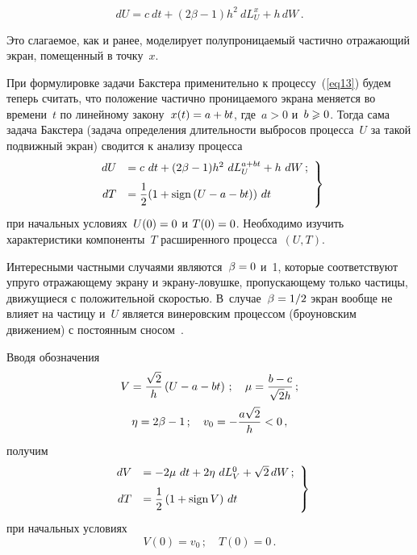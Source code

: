 \begin{multicols}{2}
\noindent
\begin{equation}
  \label{eq13}
  dU =c\ dt + (2\beta -1)h^2\ dL^x_U + h\,dW\,.
\end{equation}

\noindent
Это слагаемое, как и ранее, моделирует полупроницаемый частично отражающий экран, помещенный в точку~$x$.

При формулировке задачи Бакстера применительно к процессу~(\ref{eq13}) будем теперь считать, что положение частично проницаемого экрана меняется во времени~$t$ по линейному закону~$x(t) \hm= a \hm+ b t$, где~$a > 0$ и~$b \hm\geqslant 0$. Тогда сама задача Бакстера (задача определения длительности выбросов процесса~$U$ за такой подвижный экран) сводится к анализу процесса
\begin{equation}
  \left.
    \begin{array}{rl}
      dU &= c\ dt + (2\beta-1)h^2\ dL^{a + b t}_U + h\ dW\,;\\[6pt]
      dT &=  \displaystyle\frac{\displaystyle 1\mathstrut}{\displaystyle 2\mathstrut}(1+ \mathrm{sign}\left(U-a-bt\right))\ dt
    \end{array}
  \right\}
    \label{eq14}
\end{equation}
при начальных условиях~$U(0) \hm= 0$ и $T(0)\hm=0$. Необходимо изучить характеристики компоненты~$T$ расширенного процесса~$(U, T)$.

Интересными частными случаями являются~$\beta \hm= 0$ и~1, которые соответствуют упруго отражающему экрану и экра\-ну-ло\-вуш\-ке, пропускающему только частицы, движущиеся с положительной скоростью. В~случае~$\beta \hm= {1}/{2}$ экран вообще не влияет на частицу и~$U$ является винеровским процессом (броуновским движением) с постоянным сносом~\cite{ref17}.

Вводя обозначения
\begin{gather*}
V = \displaystyle\frac{\displaystyle \sqrt{2}\mathstrut}{\displaystyle h\mathstrut}\left(U - a - b t\right)\,;\quad
 \mu  = \displaystyle\frac{\displaystyle b - c\mathstrut}{\displaystyle \sqrt{2}h\mathstrut}\,;\\
 \eta = 2 \beta -1\,;\quad v_0 = -\displaystyle\frac{\displaystyle a \sqrt{2}\mathstrut}{\displaystyle h\mathstrut} < 0\,,
 \end{gather*}
  получим
\begin{equation}
  \left.
    \begin{array}{rl}
      dV &= -2 \mu\ dt + 2\eta\ dL^0_{V} + \sqrt{2}\,dW\,;\\[6pt]
      dT &=  \displaystyle\frac{\displaystyle 1\mathstrut}{\displaystyle 2\mathstrut}\left(1+ \mathrm{sign}\,V\right)\,dt
    \end{array}
      \right\}
        \label{eq15}
\end{equation}
при начальных условиях
\begin{equation*}
  V(0) = v_0\,;\quad T(0)=0\,.
\end{equation*}


\end{multicols}
